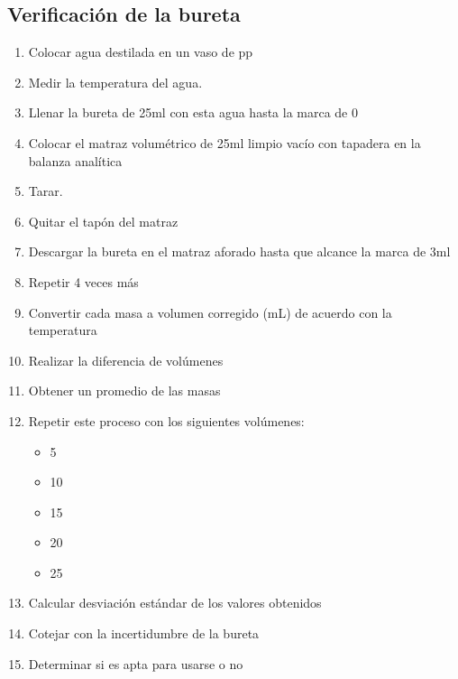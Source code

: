 \subsection{Verificación de la bureta}
\begin{enumerate}
    \item Colocar agua destilada en un vaso de pp
    \item Medir la temperatura del agua.
    \item Llenar la bureta de 25ml con esta agua hasta la marca de 0
    \item Colocar el matraz volumétrico de 25ml limpio vacío con tapadera en la balanza analítica
    \item Tarar. 
    \item Quitar el tapón del matraz
    \item Descargar la bureta en el matraz aforado hasta que alcance la marca de 3ml
    \item Repetir 4 veces más
    \item Convertir cada masa a volumen corregido (mL) de acuerdo con la temperatura
    \item Realizar la diferencia de volúmenes
    \item Obtener un promedio de las masas
    \item Repetir este proceso con los siguientes volúmenes:
    \begin{itemize}
        \item 5
        \item 10
        \item 15
        \item 20
        \item 25
    \end{itemize}
    
    \item Calcular desviación estándar de los valores obtenidos
    \item Cotejar con la incertidumbre de la bureta
    \item Determinar si es apta para usarse o no
\end{enumerate}